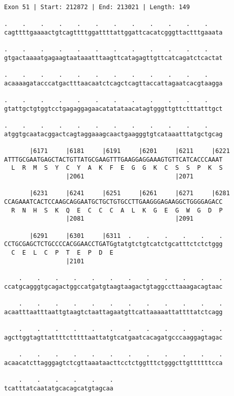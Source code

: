\documentclass{article}
\begin{document}
\begin{Verbatim}[fontfamily=courier]
Exon 51 | Start: 212872 | End: 213021 | Length: 149

.    .    .    .    .    .    .    .    .    .    .    .    
cagttttgaaaactgtcagttttggattttattggattcacatcgggttactttgaaata

.    .    .    .    .    .    .    .    .    .    .    .    
gtgactaaaatgagaagtaataaatttaagttcatagagttgttcatcagatctcactat

.    .    .    .    .    .    .    .    .    .    .    .    
acaaaagatacccatgactttaacaatctcagctcagttaccattagaatcacgtaagga

.    .    .    .    .    .    .    .    .    .    .    .    
gtattgctgtggtcctgagaggagaacatatataacatagtgggttgttctttatttgct

.    .    .    .    .    .    .    .    .    .    .    .    
atggtgcaatacggactcagtaggaaagcaactgaagggtgtcataaatttatgctgcag

       |6171     |6181     |6191     |6201     |6211     |6221
ATTTGCGAATGAGCTACTGTTATGCGAAGTTTGAAGGAGGAAAGTGTTCATCACCCAAAT
  L  R  M  S  Y  C  Y  A  K  F  E  G  G  K  C  S  S  P  K  S
                 |2061                         |2071        

       |6231     |6241     |6251     |6261     |6271     |6281
CCAGAAATCACTCCAAGCAGGAATGCTGCTGTGCCTTGAAGGGAGAAGGCTGGGGAGACC
  R  N  H  S  K  Q  E  C  C  C  A  L  K  G  E  G  W  G  D  P
                 |2081                         |2091        

       |6291     |6301     |6311  .    .    .    .    .    .
CCTGCGAGCTCTGCCCCACGGAACCTGATGgtatgtctgtcatctgcatttctctctggg
  C  E  L  C  P  T  E  P  D  E                              
                 |2101                                      

    .    .    .    .    .    .    .    .    .    .    .    .
ccatgcagggtgcagactggccatgatgtaagtaagactgtaggccttaaagacagtaac

    .    .    .    .    .    .    .    .    .    .    .    .
acaatttaatttaattgtaagtctaattagaatgttcattaaaaattattttatctcagg

    .    .    .    .    .    .    .    .    .    .    .    .
agcttggtagttattttctttttaattatgtcatgaatcacagatgcccaaggagtagac

    .    .    .    .    .    .    .    .    .    .    .    .
acaacatcttagggagtctcgttaaataacttcctctggtttctgggcttgttttttcca

    .    .    .    .    .    .
tcatttatcaatatgcacagcatgtagcaa
\end{Verbatim}
\end{document}
